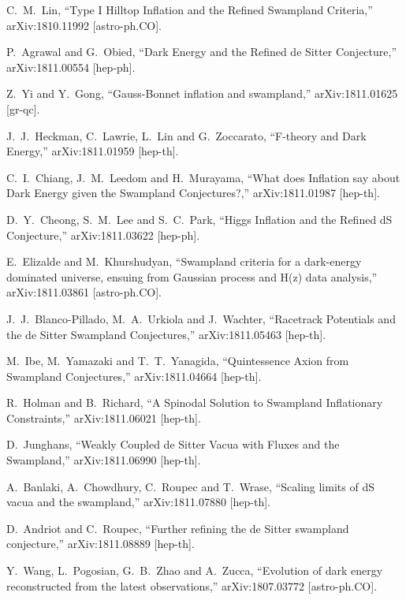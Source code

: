 \documentclass[11pt,a4paper]{article}
\begin{document}
\begin{thebibliography}{99}
  C.~M.~Lin,
  ``Type I Hilltop Inflation and the Refined Swampland Criteria,''
  arXiv:1810.11992 [astro-ph.CO].
  
  P.~Agrawal and G.~Obied,
  ``Dark Energy and the Refined de Sitter Conjecture,''
  arXiv:1811.00554 [hep-ph].
  
  Z.~Yi and Y.~Gong,
  ``Gauss-Bonnet inflation and swampland,''
  arXiv:1811.01625 [gr-qc].
  
  J.~J.~Heckman, C.~Lawrie, L.~Lin and G.~Zoccarato,
  ``F-theory and Dark Energy,''
  arXiv:1811.01959 [hep-th].
  
  C.~I.~Chiang, J.~M.~Leedom and H.~Murayama,
  ``What does Inflation say about Dark Energy given the Swampland Conjectures?,''
  arXiv:1811.01987 [hep-th].

  D.~Y.~Cheong, S.~M.~Lee and S.~C.~Park,
  ``Higgs Inflation and the Refined dS Conjecture,''
  arXiv:1811.03622 [hep-ph].
  
  E.~Elizalde and M.~Khurshudyan,
  ``Swampland criteria for a dark-energy dominated universe, ensuing from Gaussian process and H(z) data analysis,''
  arXiv:1811.03861 [astro-ph.CO].
  
  J.~J.~Blanco-Pillado, M.~A.~Urkiola and J.~Wachter,
  ``Racetrack Potentials and the de Sitter Swampland Conjectures,''
  arXiv:1811.05463 [hep-th].
  
  M.~Ibe, M.~Yamazaki and T.~T.~Yanagida,
  ``Quintessence Axion from Swampland Conjectures,''
  arXiv:1811.04664 [hep-th].
  
  R.~Holman and B.~Richard,
  ``A Spinodal Solution to Swampland Inflationary Constraints,''
  arXiv:1811.06021 [hep-th].

  D.~Junghans,
  ``Weakly Coupled de Sitter Vacua with Fluxes and the Swampland,''
  arXiv:1811.06990 [hep-th].
  
  A.~Banlaki, A.~Chowdhury, C.~Roupec and T.~Wrase,
  ``Scaling limits of dS vacua and the swampland,''
  arXiv:1811.07880 [hep-th].
  
  D.~Andriot and C.~Roupec,
  ``Further refining the de Sitter swampland conjecture,''
  arXiv:1811.08889 [hep-th].
  
  Y.~Wang, L.~Pogosian, G.~B.~Zhao and A.~Zucca,
  ``Evolution of dark energy reconstructed from the latest observations,''
  arXiv:1807.03772 [astro-ph.CO].



\end{thebibliography}
\end{document}
